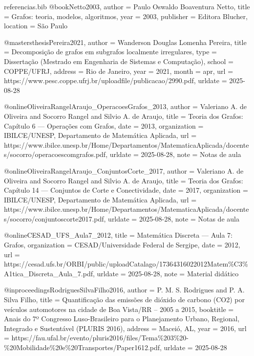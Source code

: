 \begin{filecontents*}{referencias.bib}
@book{Netto2003,
	author    = {Paulo Oswaldo Boaventura Netto},
	title     = {Grafos: teoria, modelos, algoritmos},
	year      = {2003},
	publisher = {Editora Blucher},
	location  = {São Paulo}
}

@mastersthesis{Pereira2021,
	author   = {Wanderson Douglas Lomenha Pereira},
	title    = {Decomposição de grafos em subgrafos localmente irregulares},
	type     = {Dissertação (Mestrado em Engenharia de Sistemas e Computação)},
	school   = {COPPE/UFRJ},
	address  = {Rio de Janeiro},
	year     = {2021},
	month    = apr,
	url      = {https://www.pesc.coppe.ufrj.br/uploadfile/publicacao/2990.pdf},
	urldate  = {2025-08-28}
}

@online{OliveiraRangelAraujo_OperacoesGrafos_2013,
	author        = {Valeriano A. de Oliveira and Socorro Rangel and Silvio A. de Araujo},
	title         = {Teoria dos Grafos: Capítulo 6 — Operações com Grafos},
	date          = {2013},
	organization  = {IBILCE/UNESP, Departamento de Matemática Aplicada},
	url           = {https://www.ibilce.unesp.br/Home/Departamentos/MatematicaAplicada/docentes/socorro/operacoescomgrafos.pdf},
	urldate       = {2025-08-28},
	note          = {Notas de aula}
}

@online{OliveiraRangelAraujo_ConjuntosCorte_2017,
	author        = {Valeriano A. de Oliveira and Socorro Rangel and Silvio A. de Araujo},
	title         = {Teoria dos Grafos: Capítulo 14 — Conjuntos de Corte e Conectividade},
	date          = {2017},
	organization  = {IBILCE/UNESP, Departamento de Matemática Aplicada},
	url           = {https://www.ibilce.unesp.br/Home/Departamentos/MatematicaAplicada/docentes/socorro/conjuntoscorte2017.pdf},
	urldate       = {2025-08-28},
	note          = {Notas de aula}
}

@online{CESAD_UFS_Aula7_2012,
	title         = {Matemática Discreta — Aula 7: Grafos},
	organization  = {CESAD/Universidade Federal de Sergipe},
	date          = {2012},
	url           = {https://cesad.ufs.br/ORBI/public/uploadCatalago/17364316022012Matem\%C3\%A1tica_Discreta_Aula_7.pdf},
	urldate       = {2025-08-28},
	note          = {Material didático}
}

@inproceedings{RodriguesSilvaFilho2016,
	author    = {P. M. S. Rodrigues and P. A. Silva Filho},
	title     = {Quantificação das emissões de dióxido de carbono (CO2) por veículos automotores na cidade de Boa Vista/RR – 2005 a 2015},
	booktitle = {Anais do 7º Congresso Luso-Brasileiro para o Planejamento Urbano, Regional, Integrado e Sustentável (PLURIS 2016)},
	address   = {Maceió, AL},
	year      = {2016},
	url       = {https://fau.ufal.br/evento/pluris2016/files/Tema\%203\%20-\%20Mobilidade\%20e\%20Transportes/Paper1612.pdf},
	urldate   = {2025-08-28}
}


\end{filecontents*}

